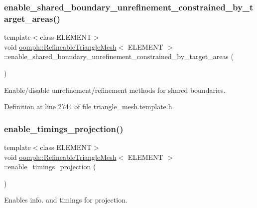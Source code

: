 \subsubsection{\texorpdfstring{enable\+\_\+shared\+\_\+boundary\+\_\+unrefinement\+\_\+constrained\+\_\+by\+\_\+target\+\_\+areas()}{enable\_shared\_boundary\_unrefinement\_constrained\_by\_target\_areas()}}
{\footnotesize\ttfamily template$<$class E\+L\+E\+M\+E\+NT$>$ \\
void \hyperlink{classoomph_1_1RefineableTriangleMesh}{oomph\+::\+Refineable\+Triangle\+Mesh}$<$ E\+L\+E\+M\+E\+NT $>$\+::enable\+\_\+shared\+\_\+boundary\+\_\+unrefinement\+\_\+constrained\+\_\+by\+\_\+target\+\_\+areas (\begin{DoxyParamCaption}{ }\end{DoxyParamCaption})\hspace{0.3cm}{\ttfamily [inline]}}



Enable/disable unrefinement/refinement methods for shared boundaries. 



Definition at line 2744 of file triangle\+\_\+mesh.\+template.\+h.

\mbox{\label{classoomph_1_1RefineableTriangleMesh_a3228cb1170b25ce7f24fb520b1df184d}} 
\subsubsection{\texorpdfstring{enable\+\_\+timings\+\_\+projection()}{enable\_timings\_projection()}}
{\footnotesize\ttfamily template$<$class E\+L\+E\+M\+E\+NT$>$ \\
void \hyperlink{classoomph_1_1RefineableTriangleMesh}{oomph\+::\+Refineable\+Triangle\+Mesh}$<$ E\+L\+E\+M\+E\+NT $>$\+::enable\+\_\+timings\+\_\+projection (\begin{DoxyParamCaption}{ }\end{DoxyParamCaption})\hspace{0.3cm}{\ttfamily [inline]}}



Enables info. and timings for projection. 



